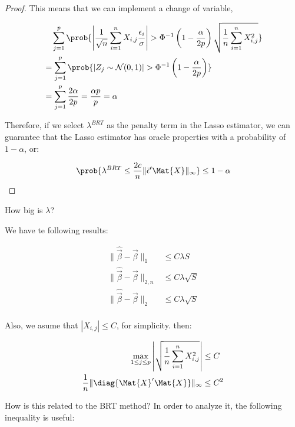 \begin{proof}
This means that we can implement a change of variable, 

\begin{align*}
&\quad \sum_{j=1}^{p} \prob{
    \left| \frac{1}{\sqrt{n}} \sum_{i=1}^{n} X_{i,j} \dfrac{\epsilon_{i}}{\sigma}\right| 
    >
    {
        \Phi^{-1}\left(1 - \dfrac{\alpha}{2p}\right)
        \sqrt{
            \dfrac{1}{n} \sum_{i=1}^n X_{i,j}^2
        }
    }
} \\
&= \sum_{j=1}^{p} \prob{
    \left|Z_j \sim \mathcal{N}(0, 1)\right| 
    >
    \Phi^{-1}\left(1 - \dfrac{\alpha}{2p}\right)
} \\
&= \sum_{j=1}^{p} \frac{2\alpha}{2p} = \frac{\alpha p}{p} = \alpha
\\
\end{align*}

Therefore, if we select $\lambda^{BRT}$ as the penalty term in the Lasso estimator, we can guarantee that the Lasso estimator has oracle properties with a probability of $1 - \alpha$, or:

\begin{align*}
\prob{
    \lambda^{BRT} 
    \leq
    \dfrac{2c}{n} \| \Vec{\epsilon}'\Mat{X}\|_{\infty}
} 
\leq
1 - \alpha
\end{align*}
\end{proof}

How big is $\lambda$?

We have te following results:

\begin{align*}
    \|\hat{\Vec{\beta}} - \Vec{\beta}\|_1 &\leq C\lambda S \\
    \|\hat{\Vec{\beta}} - \Vec{\beta}\|_{2, n} &\leq C\lambda \sqrt{S} \\
    \|\hat{\Vec{\beta}} - \Vec{\beta}\|_{2} &\leq C\lambda \sqrt{S} \\
\end{align*}

Also, we asume that $|X_{i,j}| \leq C$, for simplicity. then:

\begin{align*}
    \max_{1 \leq j \leq p} \left|\sqrt{ \frac{1}{n} \sum_{i=1}^{n} X_{i,j}^2 }\right| &\leq C\\
    \frac{1}{n} \|\diag{\Mat{X}'\Mat{X}}\|_{\infty} &\leq C^2\\
\end{align*}

How is this related to the BRT method? In order to analyze it, the following inequality is useful:

